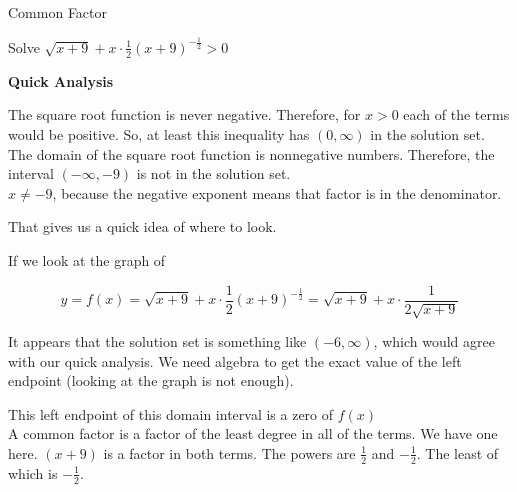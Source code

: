 \documentclass{ximera}
\begin{document}
\begin{example}  Common Factor


Solve $\sqrt{x+9} + x \cdot \frac{1}{2} (x+9)^{-\tfrac{1}{2}} > 0$





\begin{idea} \textbf{\textcolor{blue!55!black}{Quick Analysis}} 


The square root function is never negative.  Therefore, for $x > 0$ each of the terms would be positive.  So, at least this inequality has $(0, \infty)$ in the solution set.  \\


The domain of the square root function is nonnegative numbers.  Therefore, the interval $(-\infty, -9)$ is not in the solution set.   \\


$x \ne -9$, because the negative exponent means that factor is in the denominator.

\end{idea}



That gives us a quick idea of where to look.


\begin{explanation}






If we look at the graph of  

\[
y = f(x) = \sqrt{x+9} + x \cdot \frac{1}{2} (x+9)^{-\tfrac{1}{2}} = \sqrt{x+9} + x \cdot \frac{1}{2 \sqrt{x+9}} 
\]




\begin{center}
\end{center}




It appears that the solution set is something like  $(-6, \infty)$, which would agree with our quick analysis.  We need algebra to get the exact value of the left endpoint (looking at the graph is not enough).


This left endpoint of this domain interval is a zero of $f(x)$ \\ 






A common factor is a factor of the least degree in all of the terms.  We have one here. $(x+9)$ is a factor in both terms.  The powers are $\frac{1}{2}$ and $-\frac{1}{2}$. The least of which is $-\frac{1}{2}$.


\end{explanation}
\end{example}
\end{document}
